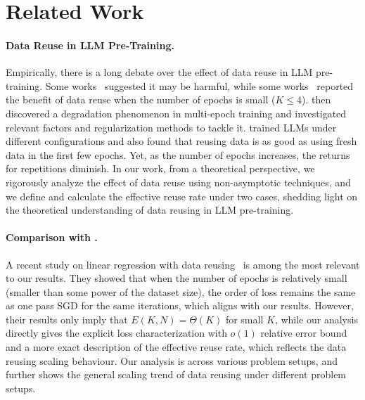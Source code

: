 \section{Related Work} \label{sec:related}

\paragraph{Data Reuse in LLM Pre-Training.} Empirically, there is a long debate over the effect of data reuse in LLM pre-training. Some works~\citep{lee2021deduplicating,hoffmann2022training,hernandez2022scaling,wang2023data} suggested it may be harmful, while some works~\citep{taylor2022galactica} reported the benefit of data reuse when the number of epochs is small ($K \le 4$).
\citet{xue2023repeat} then discovered a degradation phenomenon in multi-epoch training and investigated relevant factors and regularization methods to tackle it. \citet{muennighoff2023scaling} trained LLMs under different configurations and also found that reusing data is as good as using fresh data in the first few epochs. Yet, as the number of epochs increases, the returns for repetitions diminish. In our work, from a theoretical perspective, we rigorously analyze the effect of data reuse using non-asymptotic techniques, and we define and calculate the effective reuse rate under two cases, shedding light on the theoretical understanding of data reusing in LLM pre-training.

\paragraph{Comparison with \citet{lin2025improved}.} A recent study on linear regression with data reusing~\citep{lin2025improved} is among the most relevant to our results. They showed that when the number of epochs is relatively small (smaller than some power of the dataset size), the order of loss remains the same as one pass SGD for the same iterations, which aligns with our results. However, their results only imply that $E(K,N) = \Theta(K)$ for small $K$, while our analysis directly gives the explicit loss characterization with $o(1)$ relative error bound and a more exact description of the effective reuse rate, which reflects the data reusing scaling behaviour. Our analysis is across various problem setups, and further shows the general scaling trend of data reusing under different problem setups.

